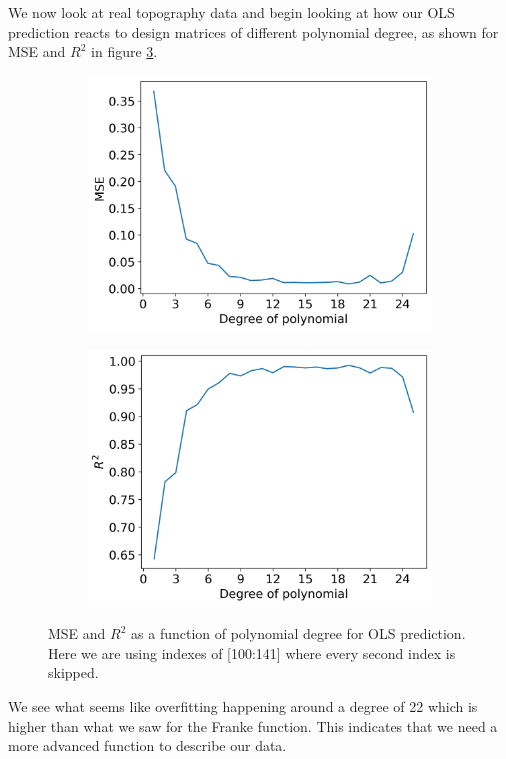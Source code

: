 \documentclass[12pt]{article}
\begin{document}
We now look at real topography data and begin looking at how our OLS prediction reacts to design matrices of different polynomial degree, as shown for MSE and $R^2$ in figure \ref{fig:mse_r2_real}.
\begin{figure}[H]
  \begin{subfigure}{.5\textwidth}
    \centering
    \includegraphics[width=\textwidth]{../figures/mse_deg_real.png}
    \caption{}
    \label{fig:}
  \end{subfigure}
  \begin{subfigure}{.5\textwidth}
    \centering
    \includegraphics[width=\textwidth]{../figures/r2_deg_real.png}
    \caption{}
    \label{fig:}
  \end{subfigure}
  \caption{MSE and $R^2$ as a function of polynomial degree for OLS prediction. Here we are using indexes of [100:141] where every second index is skipped.}
  \label{fig:mse_r2_real}
\end{figure}
We see what seems like overfitting happening around a degree of 22 which is higher than what we saw for the Franke function. This indicates that we need a more advanced function to describe our data.
\end{document}
